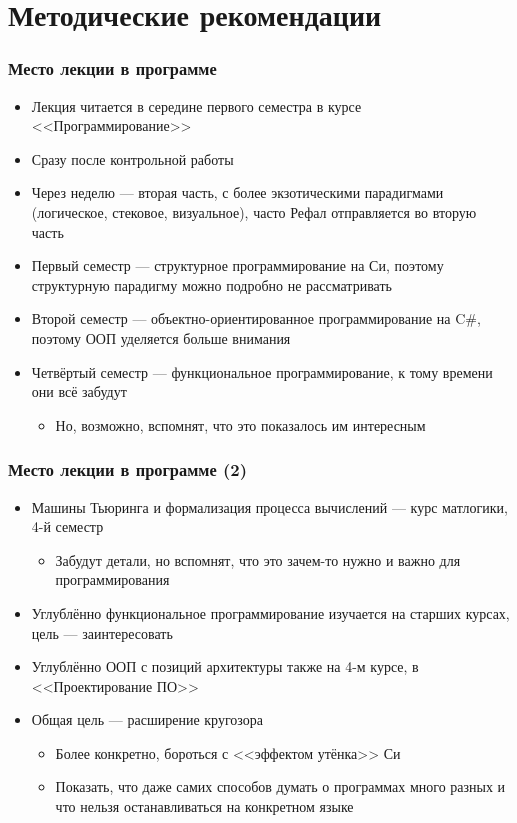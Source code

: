 \documentclass[xetex,mathserif,serif]{beamer}
\begin{document}
    \section{Методические рекомендации}

    \begin{frame}
        \frametitle{Место лекции в программе}
        \begin{itemize}
            \item Лекция читается в середине первого семестра в курсе <<Программирование>>
            \item Сразу после контрольной работы
            \item Через неделю --- вторая часть, с более экзотическими парадигмами (логическое, стековое, визуальное), часто Рефал отправляется во вторую часть
            \item Первый семестр --- структурное программирование на Си, поэтому структурную парадигму можно подробно не рассматривать
            \item Второй семестр --- объектно-ориентированное программирование на C\#, поэтому ООП уделяется больше внимания
            \item Четвёртый семестр --- функциональное программирование, к тому времени они всё забудут
            \begin{itemize}
                \item Но, возможно, вспомнят, что это показалось им интересным
            \end{itemize}
        \end{itemize}
    \end{frame}

    \begin{frame}
        \frametitle{Место лекции в программе (2)}
        \begin{itemize}
            \item Машины Тьюринга и формализация процесса вычислений --- курс матлогики, 4-й семестр
            \begin{itemize}
                \item Забудут детали, но вспомнят, что это зачем-то нужно и важно для программирования
            \end{itemize}
            \item Углублённо функциональное программирование изучается на старших курсах, цель --- заинтересовать
            \item Углублённо ООП с позиций архитектуры также на 4-м курсе, в <<Проектирование ПО>>
            \item Общая цель --- расширение кругозора
            \begin{itemize}
                \item Более конкретно, бороться с <<эффектом утёнка>> Си
                \item Показать, что даже самих способов думать о программах много разных и что нельзя останавливаться на конкретном языке
            \end{itemize}
        \end{itemize}
    \end{frame}
\end{document}
